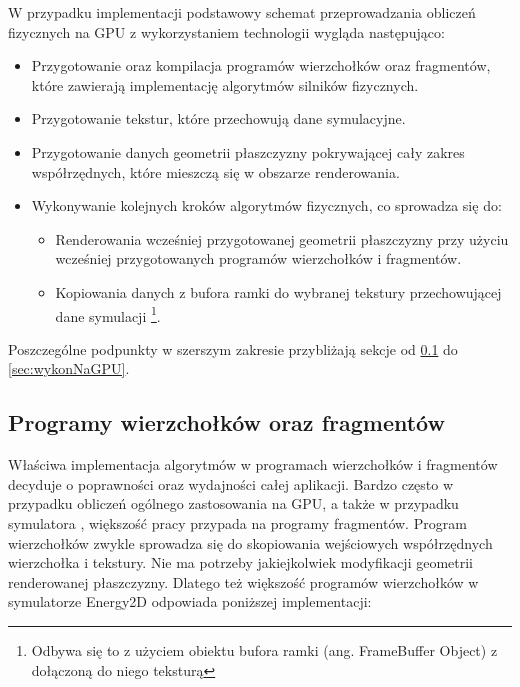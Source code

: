 W przypadku implementacji  podstawowy schemat przeprowadzania
obliczeń fizycznych na GPU z wykorzystaniem technologii  wygląda
następująco:

\begin{itemize}

\item Przygotowanie oraz kompilacja programów wierzchołków oraz fragmentów,
które zawierają implementację algorytmów silników fizycznych.

\item Przygotowanie tekstur, które przechowują dane symulacyjne. 

\item Przygotowanie danych geometrii płaszczyzny pokrywającej cały zakres
współrzędnych, które mieszczą się w obszarze renderowania.

\item Wykonywanie kolejnych kroków algorytmów fizycznych, co sprowadza się do:
	
	\begin{itemize}
	\item Renderowania wcześniej przygotowanej geometrii płaszczyzny przy użyciu
	wcześniej przygotowanych programów wierzchołków i fragmentów.

    \item Kopiowania danych z bufora ramki do wybranej tekstury przechowującej
	dane symulacji \footnote{Odbywa się to z użyciem obiektu bufora ramki (ang.
	FrameBuffer Object) z dołączoną do niego teksturą}.
	\end{itemize}

\end{itemize}

Poszczególne podpunkty w szerszym zakresie przybliżają sekcje od \ref{sec:progWierzFrag} do
\ref{sec:wykonNaGPU}.

\subsection{Programy wierzchołków oraz fragmentów}
\label{sec:progWierzFrag}

Właściwa implementacja algorytmów w programach wierzchołków i fragmentów
decyduje o poprawności oraz wydajności całej aplikacji. Bardzo często w
przypadku obliczeń ogólnego zastosowania na GPU, a także w przypadku
symulatora , większość pracy przypada na programy fragmentów.
Program wierzchołków zwykle sprowadza się do skopiowania wejściowych
współrzędnych wierzchołka i tekstury. Nie ma potrzeby jakiejkolwiek
modyfikacji geometrii renderowanej płaszczyzny. Dlatego też większość
programów wierzchołków w symulatorze Energy2D odpowiada poniższej
implementacji:

